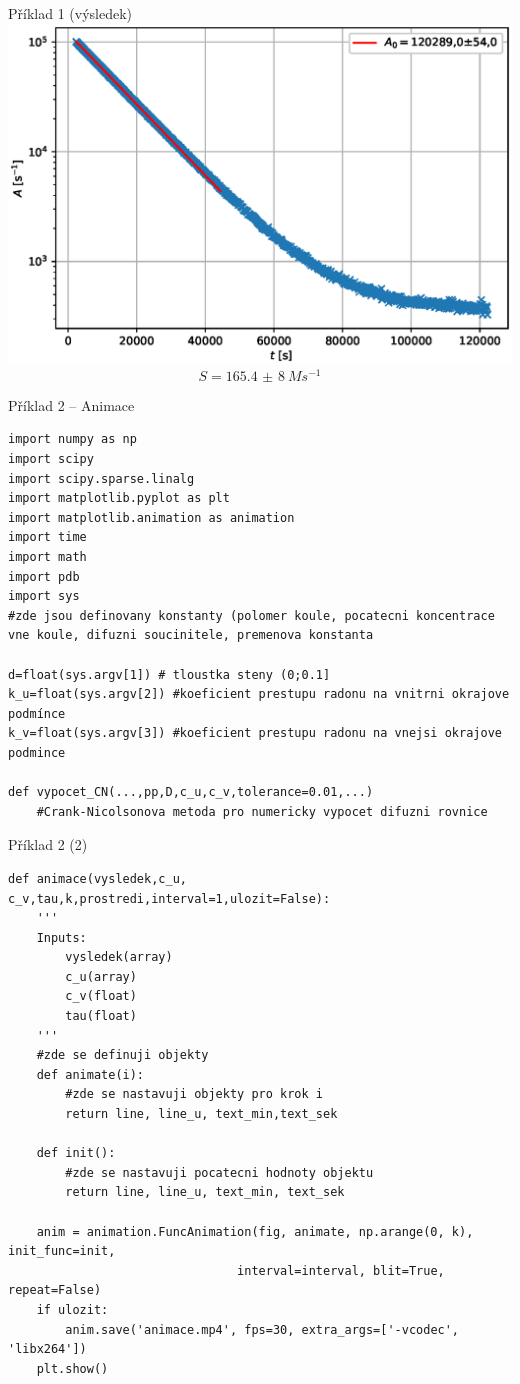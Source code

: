\documentclass[10pt]{beamer}
\begin{document}
\begin{frame}{Příklad 1 (výsledek)}
        \centering
        \includegraphics[height=.6\textwidth]{priklad1.eps}
\begin{equation}
    S=\SI[separate-uncertainty = true]{165,4(8)}{Ms^{-1}}
    \label{eq:priklad1}
\end{equation}
\end{frame}

\begin{frame}[fragile]{Příklad 2 -- Animace}
\begin{lstlisting}[columns=flexible]
import numpy as np
import scipy
import scipy.sparse.linalg
import matplotlib.pyplot as plt
import matplotlib.animation as animation
import time
import math
import pdb
import sys
#zde jsou definovany konstanty (polomer koule, pocatecni koncentrace vne koule, difuzni soucinitele, premenova konstanta

d=float(sys.argv[1]) # tloustka steny (0;0.1]
k_u=float(sys.argv[2]) #koeficient prestupu radonu na vnitrni okrajove podmínce
k_v=float(sys.argv[3]) #koeficient prestupu radonu na vnejsi okrajove podmince

def vypocet_CN(...,pp,D,c_u,c_v,tolerance=0.01,...)
    #Crank-Nicolsonova metoda pro numericky vypocet difuzni rovnice
\end{lstlisting}
\end{frame}

\begin{frame}[fragile]{Příklad 2 (2)}
\begin{lstlisting}[columns=flexible]
def animace(vysledek,c_u, c_v,tau,k,prostredi,interval=1,ulozit=False):
    '''
    Inputs:
        vysledek(array)
        c_u(array)
        c_v(float)
        tau(float)
    '''
    #zde se definuji objekty
    def animate(i):
        #zde se nastavuji objekty pro krok i
        return line, line_u, text_min,text_sek

    def init():
        #zde se nastavuji pocatecni hodnoty objektu
        return line, line_u, text_min, text_sek

    anim = animation.FuncAnimation(fig, animate, np.arange(0, k), init_func=init,
                                interval=interval, blit=True, repeat=False)
    if ulozit:
        anim.save('animace.mp4', fps=30, extra_args=['-vcodec', 'libx264'])
    plt.show()
\end{lstlisting}
\end{frame}
\end{document}
